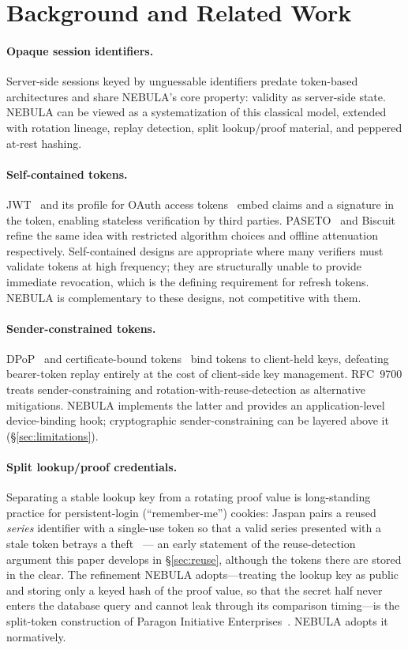 \documentclass[11pt]{article}
\begin{document}
\section{Background and Related Work}

\paragraph{Opaque session identifiers.} Server-side sessions keyed by
unguessable identifiers predate token-based architectures and share NEBULA's
core property: validity as server-side state. NEBULA can be viewed as a
systematization of this classical model, extended with rotation lineage,
replay detection, split lookup/proof material, and peppered at-rest hashing.

\paragraph{Self-contained tokens.} JWT~\cite{rfc7519} and its profile for
OAuth access tokens~\cite{rfc9068} embed claims and a signature in the
token, enabling stateless verification by third parties.
PASETO~\cite{paseto} and Biscuit~\cite{biscuit} refine the same idea with
restricted algorithm choices and offline attenuation respectively.
Self-contained designs are appropriate where many verifiers must validate
tokens at high frequency; they are structurally unable to provide immediate
revocation, which is the defining requirement for refresh tokens. NEBULA is
complementary to these designs, not competitive with them.

\paragraph{Sender-constrained tokens.} DPoP~\cite{rfc9449} and certificate-bound
tokens~\cite{rfc8705} bind tokens to client-held keys, defeating bearer-token
replay entirely at the cost of client-side key management. RFC~9700 treats
sender-constraining and rotation-with-reuse-detection as alternative
mitigations. NEBULA implements the latter and provides an application-level
device-binding hook; cryptographic sender-constraining can be layered above
it (\S\ref{sec:limitations}).

\paragraph{Split lookup/proof credentials.} Separating a stable lookup key
from a rotating proof value is long-standing practice for persistent-login
(``remember-me'') cookies: Jaspan pairs a reused \emph{series} identifier with
a single-use token so that a valid series presented with a stale token betrays
a theft~\cite{jaspan2006} --- an early statement of the reuse-detection
argument this paper develops in \S\ref{sec:reuse}, although the tokens there
are stored in the clear. The refinement NEBULA adopts---treating the lookup key
as public and storing only a keyed hash of the proof value, so that the secret
half never enters the database query and cannot leak through its comparison
timing---is the split-token construction of Paragon Initiative
Enterprises~\cite{paragonie-split}. NEBULA adopts it normatively.
\end{document}
